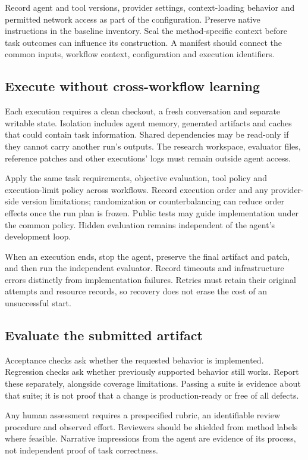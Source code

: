 \documentclass[11pt,letterpaper,twocolumn]{article}
\begin{document}
Record agent and tool versions, provider settings, context-loading behavior and permitted network access as part of the configuration. Preserve native instructions in the baseline inventory. Seal the method-specific context before task outcomes can influence its construction. A manifest should connect the common inputs, workflow context, configuration and execution identifiers.

\subsection{Execute without cross-workflow learning}
Each execution requires a clean checkout, a fresh conversation and separate writable state. Isolation includes agent memory, generated artifacts and caches that could contain task information. Shared dependencies may be read-only if they cannot carry another run's outputs. The research workspace, evaluator files, reference patches and other executions' logs must remain outside agent access.

Apply the same task requirements, objective evaluation, tool policy and execution-limit policy across workflows. Record execution order and any provider-side version limitations; randomization or counterbalancing can reduce order effects once the run plan is frozen. Public tests may guide implementation under the common policy. Hidden evaluation remains independent of the agent's development loop.

When an execution ends, stop the agent, preserve the final artifact and patch, and then run the independent evaluator. Record timeouts and infrastructure errors distinctly from implementation failures. Retries must retain their original attempts and resource records, so recovery does not erase the cost of an unsuccessful start.

\subsection{Evaluate the submitted artifact}
Acceptance checks ask whether the requested behavior is implemented. Regression checks ask whether previously supported behavior still works. Report these separately, alongside coverage limitations. Passing a suite is evidence about that suite; it is not proof that a change is production-ready or free of all defects.

Any human assessment requires a prespecified rubric, an identifiable review procedure and observed effort. Reviewers should be shielded from method labels where feasible. Narrative impressions from the agent are evidence of its process, not independent proof of task correctness.
\end{document}
